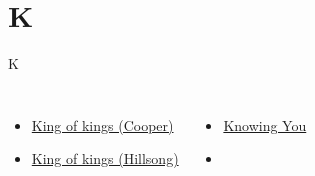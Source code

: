 \documentclass{beamer}
\begin{document}
\section{K}

\begin{frame}[t]{K}
\begin{columns}[t]
        \begin{itemize}
    \item \hyperlink{King of kings[](Cooper)}{King of kings (Cooper)} \phantom{ 1 1 1 1 1 1 1}
            \item \hyperlink{King of kings[](Hillsong)}{King of kings (Hillsong)} \phantom{ 1 1 1 1 1 1}
\end{itemize}
        \begin{itemize}
            \item \hyperlink{Knowing You['All I once held dear']}{Knowing You } \phantom{ 1 1 1 1 1 1 1 1 1 1 1 1}
    \item[] \phantom{1}\end{itemize}


\end{columns}

\end{frame}
\end{document}
